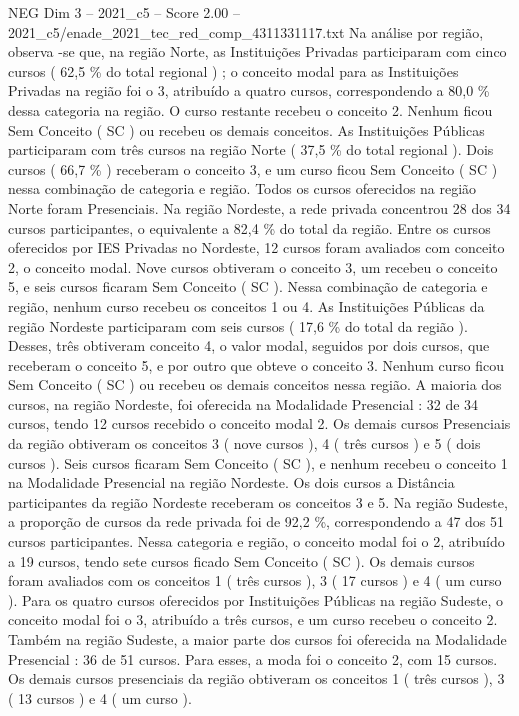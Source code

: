 \begin{textsample}{NEG Dim 3 – 2021\_c5 – Score 2.00 – 2021\_c5/enade\_2021\_tec\_red\_comp\_4311331117.txt}
Na análise por região, observa -se que, na região Norte, as Instituições Privadas participaram com cinco cursos ( 62,5 \% do total regional ) ; o conceito modal para as Instituições Privadas na região foi o 3, atribuído a quatro cursos, correspondendo a 80,0 \% dessa categoria na região.
O curso restante recebeu o conceito 2.
Nenhum ficou Sem Conceito ( SC ) ou recebeu os demais conceitos.
As Instituições Públicas participaram com três cursos na região Norte ( 37,5 \% do total regional ).
Dois cursos ( 66,7 \% ) receberam o conceito 3, e um curso ficou Sem Conceito ( SC ) nessa combinação de categoria e região.
Todos os cursos oferecidos na região Norte foram Presenciais.
Na região Nordeste, a rede privada concentrou 28 dos 34 cursos participantes, o equivalente a 82,4 \% do total da região.
Entre os cursos oferecidos por IES Privadas no Nordeste, 12 cursos foram avaliados com conceito 2, o conceito modal.
Nove cursos obtiveram o conceito 3, um recebeu o conceito 5, e seis cursos ficaram Sem Conceito ( SC ).
Nessa combinação de categoria e região, nenhum curso recebeu os conceitos 1 ou 4.
As Instituições Públicas da região Nordeste participaram com seis cursos ( 17,6 \% do total da região ).
Desses, três obtiveram conceito 4, o valor modal, seguidos por dois cursos, que receberam o conceito 5, e por outro que obteve o conceito 3.
Nenhum curso ficou Sem Conceito ( SC ) ou recebeu os demais conceitos nessa região.
A maioria dos cursos, na região Nordeste, foi oferecida na Modalidade Presencial : 32 de 34 cursos, tendo 12 cursos recebido o conceito modal 2.
Os demais cursos Presenciais da região obtiveram os conceitos 3 ( nove cursos ), 4 ( três cursos ) e 5 ( dois cursos ).
Seis cursos ficaram Sem Conceito ( SC ), e nenhum recebeu o conceito 1 na Modalidade Presencial na região Nordeste.
Os dois cursos a Distância participantes da região Nordeste receberam os conceitos 3 e 5.
Na região Sudeste, a proporção de cursos da rede privada foi de 92,2 \%, correspondendo a 47 dos 51 cursos participantes.
Nessa categoria e região, o conceito modal foi o 2, atribuído a 19 cursos, tendo sete cursos ficado Sem Conceito ( SC ).
Os demais cursos foram avaliados com os conceitos 1 ( três cursos ), 3 ( 17 cursos ) e 4 ( um curso ).
Para os quatro cursos oferecidos por Instituições Públicas na região Sudeste, o conceito modal foi o 3, atribuído a três cursos, e um curso recebeu o conceito 2.
Também na região Sudeste, a maior parte dos cursos foi oferecida na Modalidade Presencial : 36 de 51 cursos.
Para esses, a moda foi o conceito 2, com 15 cursos.
Os demais cursos presenciais da região obtiveram os conceitos 1 ( três cursos ), 3 ( 13 cursos ) e 4 ( um curso ).

\end{textsample}
